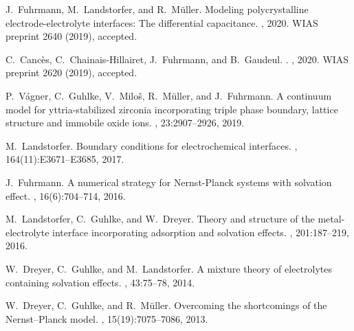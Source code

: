 \documentclass[a4paper,10pt]{article}
\newlength{\bibitemsep}\setlength{\bibitemsep}{-\baselineskip}
\begin{document}
{\small
\setlength{\bibitemsep}{\baselineskip}

\def\refname{{\normalsize Publications}}
\vspace{-4mm}

\begin{thebibliography}{1}

J.~Fuhrmann, M.~Landstorfer, and R.~Müller.
\newblock Modeling polycrystalline electrode-electrolyte interfaces: The
  differential capacitance.
, 2020.
\newblock WIAS preprint 2640 (2019), accepted.

C.~Canc{\`e}s, C.~Chainais-Hillairet, J.~Fuhrmann, and B.~Gaudeul.
.
, 2020.
\newblock WIAS preprint 2620 (2019), accepted.

P.~V{\'a}gner, C.~Guhlke, V.~Milo{\v{s}}, R.~M{\"u}ller, and J.~Fuhrmann.
\newblock A continuum model for yttria-stabilized zirconia incorporating triple
  phase boundary, lattice structure and immobile oxide ions.
, 23:2907–2926, 2019.

M.~Landstorfer.
\newblock Boundary conditions for electrochemical interfaces.
, 164(11):E3671--E3685,
  2017.

J.~Fuhrmann.
\newblock A numerical strategy for {Nernst}-{Planck} systems with solvation
  effect.
, 16(6):704--714, 2016.

M.~Landstorfer, C.~Guhlke, and W.~Dreyer.
\newblock Theory and structure of the metal-electrolyte interface incorporating
  adsorption and solvation effects.
, 201:187--219, 2016.

W.~Dreyer, C.~Guhlke, and M.~Landstorfer.
\newblock A mixture theory of electrolytes containing solvation effects.
, 43:75--78, 2014.

W.~Dreyer, C.~Guhlke, and R.~M{\"u}ller.
\newblock Overcoming the shortcomings of the {Nernst}--{Planck} model.
, 15(19):7075--7086, 2013.


\end{thebibliography}}
\end{document}
